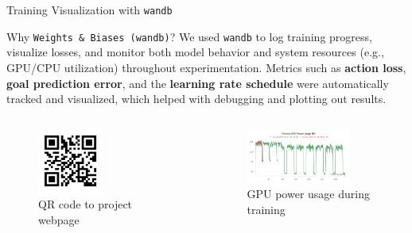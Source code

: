 \documentclass{beamer}
\begin{document}
\begin{frame}{Training Visualization with \texttt{wandb}}

    \begin{block}{Why \texttt{Weights \& Biases (wandb)}?}
        We used \texttt{wandb} to log training progress, visualize losses, and monitor both model behavior and system resources (e.g., GPU/CPU utilization) throughout experimentation. 
        Metrics such as \textbf{action loss}, \textbf{goal prediction error}, and the \textbf{learning rate schedule} were automatically tracked and visualized, 
        which helped with debugging and plotting out results.
    \end{block}

    \begin{columns}
        \begin{column}{0.4\textwidth}
            \begin{figure}
                \includegraphics[width=0.5\textwidth]{images/qr_project.png}
                \caption{QR code to project webpage}
            \end{figure}
        \end{column}
        \begin{column}{0.6\textwidth}
            \begin{figure}
                \includegraphics[width=0.8\textwidth]{images/gpu_powerusage.png}
                \caption{GPU power usage during training}
            \end{figure}
        \end{column}
    \end{columns}

\end{frame}
\end{document}
